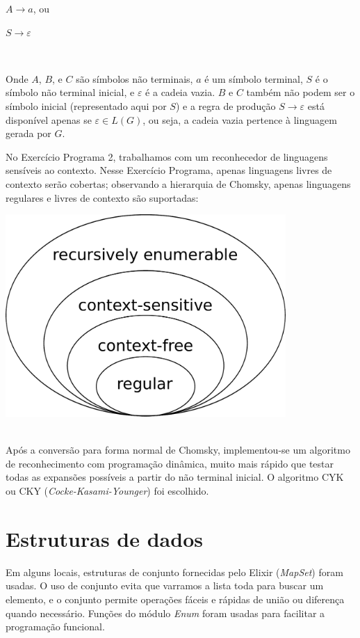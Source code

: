 \documentclass[conference]{IEEEtran}
\begin{document}
$A \to a$, ou

$S \to \varepsilon$

\

Onde $A$, $B$, e $C$ são símbolos não terminais, $a$ é um símbolo terminal, $S$ é o símbolo não terminal inicial, e $\varepsilon$ é a cadeia vazia. $B$ e $C$ também não podem ser o símbolo inicial (representado aqui por $S$) e a regra de produção $S \to \varepsilon$ está disponível apenas se $\varepsilon \in L(G)$, ou seja, a cadeia vazia pertence à linguagem gerada por $G$.

No Exercício Programa 2, trabalhamos com um reconhecedor de linguagens sensíveis ao contexto. Nesse Exercício Programa, apenas linguagens livres de contexto serão cobertas; observando a hierarquia de Chomsky, apenas linguagens regulares e livres de contexto são suportadas:

\begin{minipage}{\linewidth}
    \centering
    \label{chomsky}
    \includegraphics[width=0.8\textwidth]{Chomsky-hierarchy.pdf}
\end{minipage}
\\

Após a conversão para forma normal de Chomsky, implementou-se um algoritmo de reconhecimento com programação dinâmica, muito mais rápido que testar todas as expansões possíveis a partir do não terminal inicial. O algoritmo CYK ou CKY (\emph{Cocke-Kasami-Younger}) \cite{cky} foi escolhido.

\section{Estruturas de dados}

Em alguns locais, estruturas de conjunto fornecidas pelo Elixir (\emph{MapSet}) foram usadas. O uso de conjunto evita que varramos a lista toda para buscar um elemento, e o conjunto permite operações fáceis e rápidas de união ou diferença quando necessário. Funções do módulo \emph{Enum} foram usadas para facilitar a programação funcional.
\end{document}
